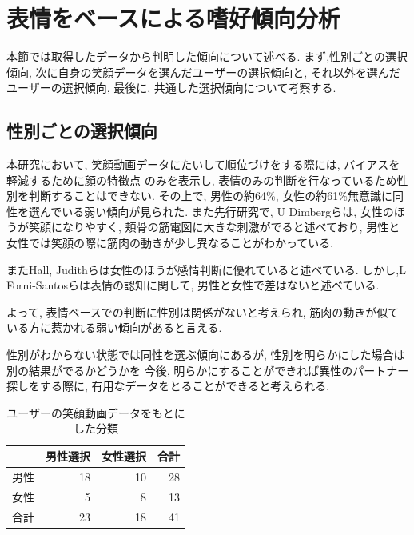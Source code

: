 \section{表情をベースによる嗜好傾向分析}
本節では取得したデータから判明した傾向について述べる.
まず,性別ごとの選択傾向, 次に自身の笑顔データを選んだユーザーの選択傾向と, それ以外を選んだユーザーの選択傾向,
最後に, 共通した選択傾向について考察する.

\subsection{性別ごとの選択傾向}
本研究において, 笑顔動画データにたいして順位づけをする際には, バイアスを軽減するために顔の特徴点
のみを表示し, 表情のみの判断を行なっているため性別を判断することはできない.
その上で, 男性の約64\%, 女性の約61\%無意識に同性を選んでいる弱い傾向が見られた.
また先行研究で,
U Dimbergらは, 女性のほうが笑顔になりやすく, 頬骨の筋電図に大きな刺激がでると述べており\cite{dimberg1990gender},
男性と女性では笑顔の際に筋肉の動きが少し異なることがわかっている.

またHall, Judithらは女性のほうが感情判断に優れていると述べている\cite{hall2004gender}.
しかし,L Forni-Santosらは表情の認知に関して, 男性と女性で差はないと述べている.\cite{forni2015influence}

よって, 表情ベースでの判断に性別は関係がないと考えられ, 筋肉の動きが似ている方に惹かれる弱い傾向があると言える.

性別がわからない状態では同性を選ぶ傾向にあるが, 性別を明らかにした場合は別の結果がでるかどうかを
今後, 明らかにすることができれば異性のパートナー探しをする際に, 有用なデータをとることができると考えられる.

\begin{table}[htb]
  \caption{ユーザーの笑顔動画データをもとにした分類}
  \label{tb:agegenderchart}
  \begin{center}
  \begin{tabular}{|l|r|r||r|} \hline
    　&男性選択&女性選択&合計 \\ \hline \hline
    男性&18&10&28 \\
    女性&5&8&13 \\ \hline \hline
    合計&23&18&41 \\ \hline
  \end{tabular}
  \end{center}
\end{table}



